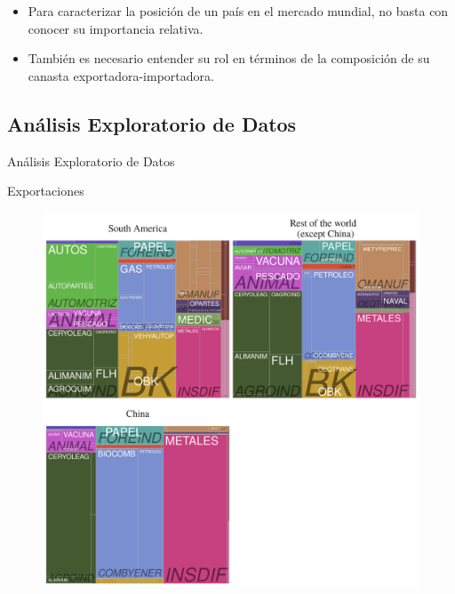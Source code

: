 \documentclass[compress]{beamer}
\begin{document}
\begin{frame}
\begin{itemize}[label=\faRebel]
	\item Para caracterizar la posición de un país en el mercado mundial, no basta con conocer su importancia relativa.
	\item También es necesario entender su rol en términos de la composición de su canasta exportadora-importadora.
	
\end{itemize}
\end{frame}

\subsection{Análisis Exploratorio de Datos}

\begin{frame}
\centering
\Large Análisis Exploratorio de Datos
\end{frame}


\begin{frame}
\tiny Exportaciones
\begin{figure}
\includegraphics[scale=0.4]{treemaps_cadsubcad2016}
\end{figure}
\end{frame}
\end{document}

